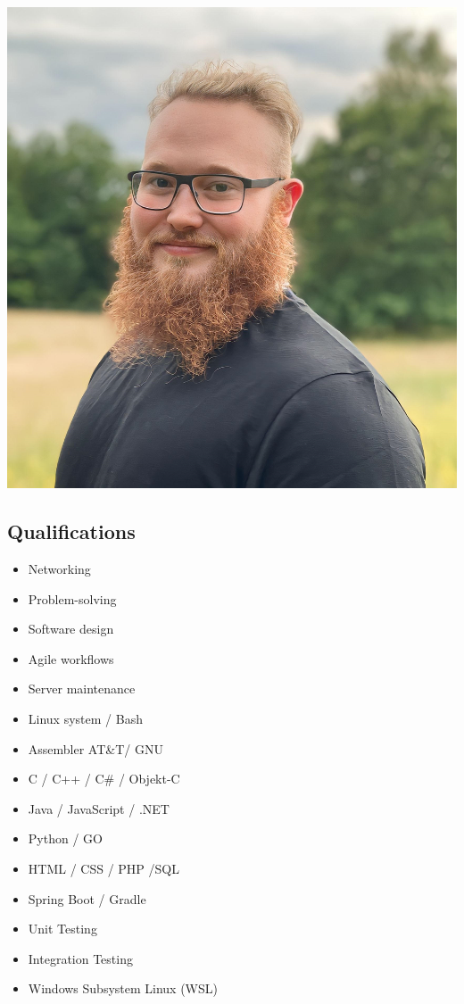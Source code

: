 \documentclass{article}
\begin{document}
	\begin{minipage}[t]{0.28\textwidth}
		\begin{minipage}[t]{0.8\textwidth}
			\vspace{-140pt} %
			\includegraphics[scale=0.75, natwidth=1717, natheight=1837]{../../me.png}
			\label{fig:bild}
		\end{minipage}
		\vspace{-10pt} %
		\subsection*{\textcolor{colorBlue}{Qualifications}}
		\begin{itemize}
			\item Networking
			\item Problem-solving
			\item Software design
			\item Agile workflows
			\item Server maintenance
			\item Linux system / Bash
			\item Assembler AT\&T/ GNU
			\item C / C++ / C\# / Objekt-C
			\item Java / JavaScript / .NET
			\item Python / GO
			\item HTML / CSS / PHP /SQL
			\item Spring Boot / Gradle
			\item Unit Testing
			\item Integration Testing
			\item Windows Subsystem Linux (WSL)
		\end{itemize}
		\vspace{-10pt} %

\end{minipage}
\end{document}
